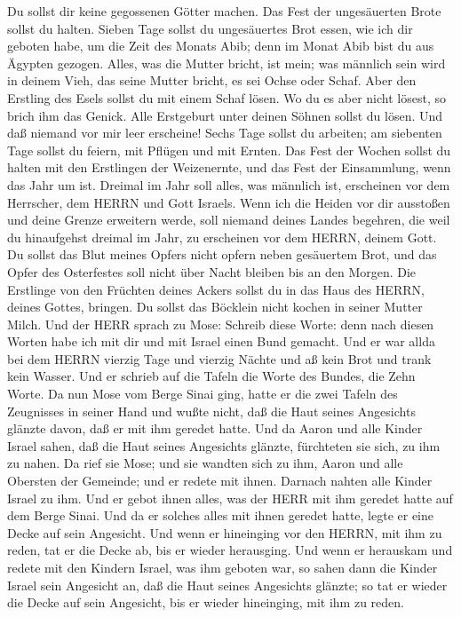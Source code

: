  Du sollst dir keine gegossenen Götter machen.
 Das Fest der ungesäuerten Brote sollst du halten. Sieben
Tage sollst du ungesäuertes Brot essen, wie ich dir geboten habe, um die
Zeit des Monats Abib; denn im Monat Abib bist du aus Ägypten gezogen.
 Alles, was die Mutter bricht, ist mein; was männlich sein
wird in deinem Vieh, das seine Mutter bricht, es sei Ochse oder Schaf.
 Aber den Erstling des Esels sollst du mit einem Schaf
lösen. Wo du es aber nicht lösest, so brich ihm das Genick. Alle
Erstgeburt unter deinen Söhnen sollst du lösen. Und daß niemand vor mir
leer erscheine!  Sechs Tage sollst du arbeiten; am
siebenten Tage sollst du feiern, mit Pflügen und mit Ernten.
 Das Fest der Wochen sollst du halten mit den Erstlingen
der Weizenernte, und das Fest der Einsammlung, wenn das Jahr um ist.
 Dreimal im Jahr soll alles, was männlich ist, erscheinen
vor dem Herrscher, dem HERRN und Gott Israels.  Wenn ich
die Heiden vor dir ausstoßen und deine Grenze erweitern werde, soll
niemand deines Landes begehren, die weil du hinaufgehst dreimal im Jahr,
zu erscheinen vor dem HERRN, deinem Gott.  Du sollst das
Blut meines Opfers nicht opfern neben gesäuertem Brot, und das Opfer des
Osterfestes soll nicht über Nacht bleiben bis an den Morgen.
 Die Erstlinge von den Früchten deines Ackers sollst du in
das Haus des HERRN, deines Gottes, bringen. Du sollst das Böcklein nicht
kochen in seiner Mutter Milch.  Und der HERR sprach zu
Mose: Schreib diese Worte: denn nach diesen Worten habe ich mit dir und
mit Israel einen Bund gemacht.  Und er war allda bei dem
HERRN vierzig Tage und vierzig Nächte und aß kein Brot und trank kein
Wasser. Und er schrieb auf die Tafeln die Worte des Bundes, die Zehn
Worte.  Da nun Mose vom Berge Sinai ging, hatte er die zwei
Tafeln des Zeugnisses in seiner Hand und wußte nicht, daß die Haut
seines Angesichts glänzte davon, daß er mit ihm geredet hatte.
 Und da Aaron und alle Kinder Israel sahen, daß die Haut
seines Angesichts glänzte, fürchteten sie sich, zu ihm zu nahen.
 Da rief sie Mose; und sie wandten sich zu ihm, Aaron und
alle Obersten der Gemeinde; und er redete mit ihnen. 
Darnach nahten alle Kinder Israel zu ihm. Und er gebot ihnen alles, was
der HERR mit ihm geredet hatte auf dem Berge Sinai.  Und da
er solches alles mit ihnen geredet hatte, legte er eine Decke auf sein
Angesicht.  Und wenn er hineinging vor den HERRN, mit ihm
zu reden, tat er die Decke ab, bis er wieder herausging. Und wenn er
herauskam und redete mit den Kindern Israel, was ihm geboten war,
 so sahen dann die Kinder Israel sein Angesicht an, daß die
Haut seines Angesichts glänzte; so tat er wieder die Decke auf sein
Angesicht, bis er wieder hineinging, mit ihm zu reden.

